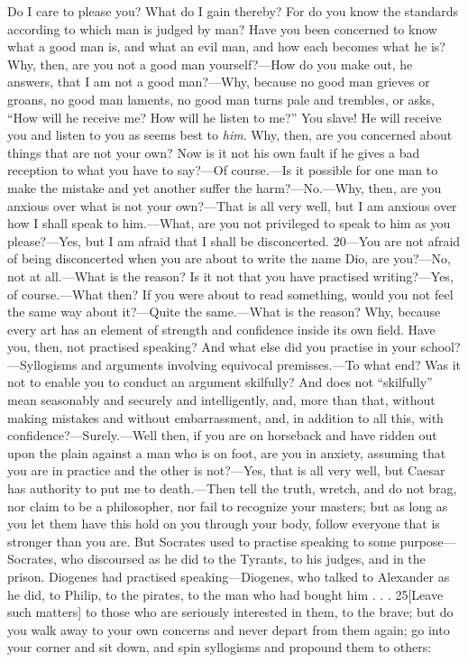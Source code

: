 Do I care to please you? What do I gain thereby? For do you know the standards according to which man is judged by man? Have you been concerned to know what a good man is, and what an evil man, and how each becomes what he is? Why, then, are you not a good man yourself?—How do you make out, he answers, that I am not a good man?—Why, because no good man grieves or groans, no good man laments, no good man turns pale and trembles, or asks, ``How will he receive me? How will he listen to me?'' You slave! He will receive you and listen to you as seems best to \emph{him}. Why, then, are you concerned about things that are not your own? Now is it not his own fault if he gives a bad reception to what you have to say?—Of course.—Is it possible for one man to make the mistake and yet another suffer the harm?—No.—Why, then, are you anxious over what is not your own?—That is all very well, but I am anxious over how I shall speak to him.—What, are you not privileged to speak to him as you please?—Yes, but I am afraid that I shall be disconcerted. 20—You are not afraid of being disconcerted when you are about to write the name Dio, are you?—No, not at all.—What is the reason? Is it not that you have practised writing?—Yes, of course.—What then? If you were about to read something, would you not feel the same way about it?—Quite the same.—What is the reason? Why, because every art has an element of strength and confidence inside its own field. Have you, then, not practised speaking? And what else did you practise in your school?—Syllogisms and arguments involving equivocal premisses.—To what end? Was it not to enable you to conduct an argument skilfully? And does not ``skilfully'' mean seasonably and securely and intelligently, and, more than that, without making mistakes and without embarrassment, and, in addition to all this, with confidence?—Surely.—Well then, if you are on horseback and have ridden out upon the plain against a man who is on foot, are you in anxiety, assuming that you are in practice and the other is not?—Yes, that is all very well, but Caesar has authority to put me to death.—Then tell the truth, wretch, and do not brag, nor claim to be a philosopher, nor fail to recognize your masters; but as long as you let them have this hold on you through your body, follow everyone that is stronger than you are. But Socrates used to practise speaking to some purpose—Socrates, who discoursed as he did to the Tyrants, to his judges, and in the prison. Diogenes had practised speaking—Diogenes, who talked to Alexander as he did, to Philip, to the pirates, to the man who had bought him . . . 25[Leave such matters] to those who are seriously interested in them, to the brave; but do you walk away to your own concerns and never depart from them again; go into your corner and sit down, and spin syllogisms and propound them to others:

